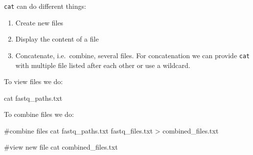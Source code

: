 \documentclass[
  letterpaper,
  DIV=11,
  numbers=noendperiod]{scrreprt}
\newenvironment{Shaded}{}{}
\newcommand{\CommentTok}[1]{\textcolor[rgb]{0.42,0.45,0.49}{#1}}
\newcommand{\FunctionTok}[1]{\textcolor[rgb]{0.44,0.26,0.76}{#1}}
\newcommand{\NormalTok}[1]{\textcolor[rgb]{0.14,0.16,0.18}{#1}}
\newcommand{\OperatorTok}[1]{\textcolor[rgb]{0.14,0.16,0.18}{#1}}
\providecommand{\tightlist}{%
  \setlength{\itemsep}{0pt}\setlength{\parskip}{0pt}}\usepackage{longtable,booktabs,array}
\begin{document}
\texttt{cat} can do different things:

\begin{enumerate}
\def\labelenumi{\arabic{enumi}.}
\tightlist
\item
  Create new files
\item
  Display the content of a file
\item
  Concatenate, i.e.~combine, several files. For concatenation we can
  provide \texttt{cat} with multiple file listed after each other or use
  a wildcard.
\end{enumerate}

To view files we do:

\begin{Shaded}
\begin{Highlighting}[]
\FunctionTok{cat}\NormalTok{ fastq\_paths.txt}
\end{Highlighting}
\end{Shaded}

To combine files we do:

\begin{Shaded}
\begin{Highlighting}[]
\CommentTok{\#combine files }
\FunctionTok{cat}\NormalTok{ fastq\_paths.txt fastq\_files.txt }\OperatorTok{\textgreater{}}\NormalTok{ combined\_files.txt}

\CommentTok{\#view new file }
\FunctionTok{cat}\NormalTok{ combined\_files.txt}
\end{Highlighting}
\end{Shaded}
\end{document}
